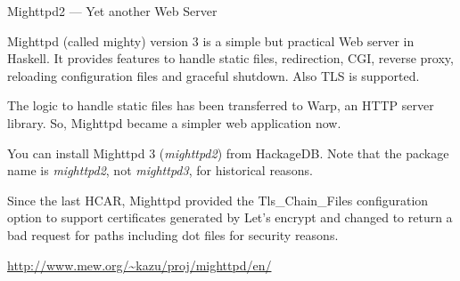 \begin{hcarentry}[updated]{Mighttpd2 --- Yet another Web Server}
\label{mighttpd2}
\makeheader

Mighttpd (called mighty) version 3 is a simple but practical Web server in
Haskell. It provides features to handle static files, redirection, CGI,
reverse proxy, reloading configuration files and graceful shutdown. Also TLS
is supported.

The logic to handle static files has been transferred to Warp, an HTTP server
library. So, Mighttpd became a simpler web application now.

You can install Mighttpd 3 ({\it mighttpd2}) from HackageDB. Note that the
package name is {\it mighttpd2}, not {\it mighttpd3}, for historical reasons.

Since the last HCAR, Mighttpd provided the Tls\_Chain\_Files configuration option to support certificates generated by Let's encrypt and changed to return a bad request for paths including dot files for security reasons.

\FurtherReading
\begin{compactitem}
\item \url{http://www.mew.org/~kazu/proj/mighttpd/en/}
\end{compactitem}
\end{hcarentry}
